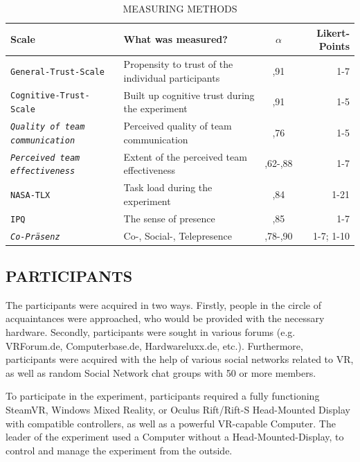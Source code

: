 \documentclass[sigchi]{acmart}
\begin{document}
\begin{table}
  \caption{MEASURING METHODS}
  \label{questionnaires}
  \begin{tabular}{llcr}
    \toprule
    Scale & What was measured? & $\alpha$ & Likert-Points \\
    \midrule
    \texttt{General-Trust-Scale \citep{couch1996assessment}} & Propensity to trust of the individual participants & ,91 & 1-7 \\
    
    \texttt{Cognitive-Trust-Scale \citep[p. 37]{mcallister1995affect}} &Built up cognitive trust during the experiment & ,91 & 1-5\\
    
     \texttt{\textit{Quality of team communication} \citep[p. 1049]{gonzalez2014climate}} & Perceived quality of team communication & ,76 & 1-5 \\
     
      \texttt{\textit{Perceived team effectiveness}\citep[p. 469]{gibson2003team}} & Extent of the perceived team effectiveness & ,62-,88 & 1-7\\
          
       \texttt{NASA-TLX\citep{NASATLX}} & Task load during the experiment & ,84 &1-21  \\
       
       \texttt{IPQ \citep{IPQ}} & The sense of presence & ,85 & 1-7 \\
       
        \texttt{\textit{Co-Präsenz} \citep[p. 487]{nowak2003effect}} &  Co-, Social-, Telepresence & ,78-,90 & 1-7; 1-10 \\
    \bottomrule
  \end{tabular}
\end{table}

\subsection{PARTICIPANTS}

The participants were acquired in two ways. Firstly, people in the circle of acquaintances were approached, who would be provided with the necessary hardware. Secondly, participants were sought in various forums (e.g. VRForum.de, Computerbase.de, Hardwareluxx.de, etc.). Furthermore, participants were acquired with the help of various social networks related to VR, as well as random Social Network chat groups with 50 or more members.

To participate in the experiment, participants required a fully functioning SteamVR, Windows Mixed Reality, or Oculus Rift/Rift-S Head-Mounted Display with compatible controllers, as well as a powerful VR-capable Computer. The leader of the experiment used a Computer without a Head-Mounted-Display, to control and manage the experiment from the outside.
\end{document}
